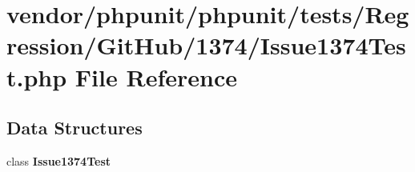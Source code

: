 \section{vendor/phpunit/phpunit/tests/\+Regression/\+Git\+Hub/1374/\+Issue1374\+Test.php File Reference}
\label{_issue1374_test_8php}
\subsection*{Data Structures}
\begin{DoxyCompactItemize}
\item 
class {\bf Issue1374\+Test}
\end{DoxyCompactItemize}
